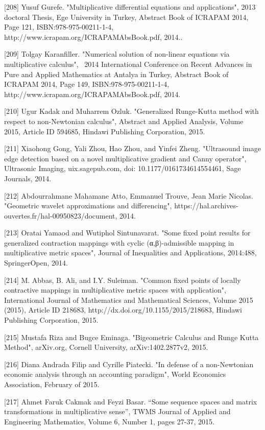 \documentclass[12pt]{article}
\begin{document}
[208] Yusuf Gurefe. "Multiplicative differential equations and applications", 2013 doctoral Thesis, Ege University in Turkey, Abstract Book of ICRAPAM 2014, Page 121, ISBN:978-975-00211-1-4, http://www.icrapam.org/ICRAPAMAbsBook.pdf, 2014..

[209] Tolgay Karanfiller. "Numerical solution of non-linear equations via multiplicative calculus",  2014 International Conference on Recent Advances in Pure and Applied Mathematics at Antalya in Turkey, Abstract Book of ICRAPAM 2014, Page 149, ISBN:978-975-00211-1-4, http://www.icrapam.org/ICRAPAMAbsBook.pdf, 2014.

[210] Ugur Kadak and Muharrem Ozluk. "Generalized Runge-Kutta method with respect to non-Newtonian calculus", Abstract and Applied Analysis, Volume 2015, Article ID 594685, Hindawi Publishing Corporation, 2015.

[211] Xiaohong Gong, Yali Zhou, Hao Zhou, and Yinfei Zheng. "Ultrasound image edge detection based on a novel multiplicative gradient and Canny operator", Ultrasonic Imaging, uix.sagepub.com, doi: 10.1177/0161734614554461, Sage Journals, 2014.

[212] Abdourrahmane Mahamane Atto, Emmanuel Trouve, Jean Marie Nicolas. "Geometric wavelet approximations and differencing", https://hal.archives-ouvertes.fr/hal-00950823/document, 2014.

[213] Oratai Yamaod and Wutiphol Sintunavarat. "Some fixed point results for generalized contraction mappings with cyclic (α,β)-admissible mapping in multiplicative metric spaces", Journal of Inequalities and Applications, 2014:488, SpringerOpen, 2014.

[214] M. Abbas, B. Ali, and I.Y. Suleiman. "Common fixed points of locally contractive mappings in multiplicative metric spaces with application", International Journal of Mathematics and Mathematical Sciences, Volume 2015 (2015), Article ID 218683, http://dx.doi.org/10.1155/2015/218683, Hindawi Publishing Corporation, 2015. 

[215] Mustafa Riza and Bugce Eminaga. "Bigeometric Calculus and Runge Kutta Method", arXiv.org, Cornell University, arXiv:1402.2877v2, 2015. 

[216] Diana Andrada Filip and Cyrille Piatecki. "In defense of a non-Newtonian economic analysis through an accounting paradigm", World Economics Association, February of 2015.

[217] Ahmet Faruk Cakmak and Feyzi Basar. “Some sequence spaces and matrix transformations in multiplicative sense”, TWMS Journal of Applied and Engineering Mathematics, Volume 6, Number 1, pages 27-37, 2015.
\end{document}
